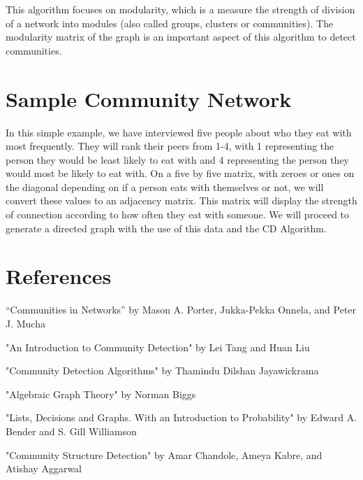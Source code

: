 \documentclass{article}
\begin{document}
\noindent This algorithm focuses on modularity, which is a measure the strength of division of a network into modules (also called groups, clusters or communities). The modularity matrix of the graph is an important aspect of this algorithm to detect communities. 


\section{Sample Community Network}
In this simple example, we have interviewed five people about who they eat with most frequently. 
They will rank their peers from 1-4, with 1 representing the person they would be least likely to eat with and 4 representing the person they would most be likely to eat with. 
On a five by five matrix, with zeroes or ones on the diagonal depending on if a person eats with themselves or not, we will convert these values to an adjacency matrix.
This matrix will display the strength of connection according to how often they eat with someone.
We will proceed to generate a directed graph with the use of this data and the CD Algorithm.

\pagebreak
\section*{References}

\bigskip

\noindent “Communities in Networks” by Mason A. Porter, Jukka-Pekka Onnela, and Peter J. Mucha

\bigskip 

\noindent "An Introduction to Community Detection" by Lei Tang and Huan Liu

\bigskip 

\noindent "Community Detection Algorithms" by Thamindu Dilshan Jayawickrama

\bigskip 

\noindent "Algebraic Graph Theory" by Norman Biggs

\bigskip 

\noindent "Lists, Decisions and Graphs. With an Introduction to Probability" by Edward A. Bender and S. Gill Williamson

\bigskip 

\noindent "Community Structure Detection" by Amar Chandole, Ameya Kabre, and Atishay Aggarwal


\end{document}
